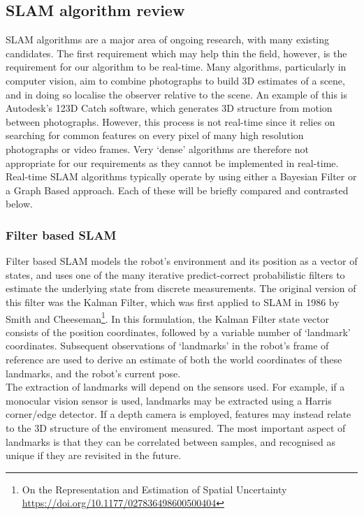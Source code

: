 \documentclass[capstone_report.tex]{subfiles}
\begin{document}
    \subsection{SLAM algorithm review}
    SLAM algorithms are a major area of ongoing research, with many existing candidates. The first requirement which may help thin the field, however, is the requirement for our algorithm to be real-time. Many algorithms, particularly in computer vision, aim to combine photographs to build 3D estimates of a scene, and in doing so localise the observer relative to the scene. An example of this is Autodesk's 123D Catch software, which generates 3D structure from motion between photographs. However, this process is not real-time since it relies on searching for common features on every pixel of many high resolution photographs or video frames. Very `dense' algorithms are therefore not appropriate for our requirements as they cannot be implemented in real-time. \\

    Real-time SLAM algorithms typically operate by using either a Bayesian Filter or a Graph Based approach. Each of these will be briefly compared and contrasted below.

    \subsubsection{Filter based SLAM}
    Filter based SLAM models the robot's environment and its position as a vector of states, and uses one of the many iterative predict-correct probabilistic filters to estimate the underlying state from discrete measurements. The original version of this filter was the Kalman Filter, which was first applied to SLAM in 1986 by Smith and Cheeseman\footnote{On the Representation and Estimation of Spatial Uncertainty \url{https://doi.org/10.1177/027836498600500404}}. In this formulation, the Kalman Filter state vector consists of the position coordinates, followed by a variable number of `landmark' coordinates. Subsequent observations of `landmarks' in the robot's frame of reference are used to derive an estimate of both the world coordinates of these landmarks, and the robot's current pose. \\

    The extraction of landmarks will depend on the sensors used. For example, if a monocular vision sensor is used, landmarks may be extracted using a Harris corner/edge detector. If a depth camera is employed, features may instead relate to the 3D structure of the enviroment measured. The most important aspect of landmarks is that they can be correlated between samples, and recognised as unique if they are revisited in the future.\\
\end{document}
